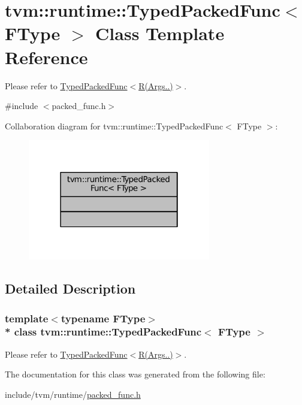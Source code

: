 \hypertarget{classtvm_1_1runtime_1_1TypedPackedFunc}{}\section{tvm\+:\+:runtime\+:\+:Typed\+Packed\+Func$<$ F\+Type $>$ Class Template Reference}
\label{classtvm_1_1runtime_1_1TypedPackedFunc}


Please refer to \hyperlink{classtvm_1_1runtime_1_1TypedPackedFunc_3_01R_07Args_8_8_8_08_4_TypedPackedFuncAnchor}{Typed\+Packed\+Func$<$R(Args..)$>$}.  




{\ttfamily \#include $<$packed\+\_\+func.\+h$>$}



Collaboration diagram for tvm\+:\+:runtime\+:\+:Typed\+Packed\+Func$<$ F\+Type $>$\+:
\nopagebreak
\begin{figure}[H]
\begin{center}
\leavevmode
\includegraphics[width=226pt]{classtvm_1_1runtime_1_1TypedPackedFunc__coll__graph}
\end{center}
\end{figure}


\subsection{Detailed Description}
\subsubsection*{template$<$typename F\+Type$>$\\*
class tvm\+::runtime\+::\+Typed\+Packed\+Func$<$ F\+Type $>$}

Please refer to \hyperlink{classtvm_1_1runtime_1_1TypedPackedFunc_3_01R_07Args_8_8_8_08_4_TypedPackedFuncAnchor}{Typed\+Packed\+Func$<$R(Args..)$>$}. 

The documentation for this class was generated from the following file\+:\begin{DoxyCompactItemize}
\item 
include/tvm/runtime/\hyperlink{packed__func_8h}{packed\+\_\+func.\+h}\end{DoxyCompactItemize}
